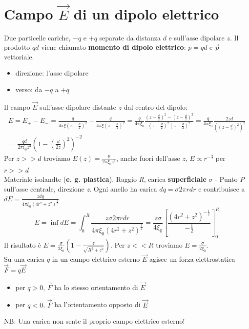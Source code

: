 \section{Campo $\vec{E}$ di un dipolo elettrico}
Due particelle cariche, $-q$ e $+q$ separate da distanza $d$ e sull'asse dipolare $z$. Il prodotto $qd$ viene chiamato \textbf{momento di dipolo elettrico}: $p=qd$ e $\vec{p}$ vettoriale.
\begin{itemize}
\item direzione: l'asse dipolare
\item verso: da $-q$ a $+q$
\end{itemize}
Il campo $\vec{E}$ sull'asse dipolare distante $z$ dal centro del dipolo:
\begin{equation}
  \begin{matrix}
    E=E_+-E_-=\frac{q}{4\pi \xi\left(z-\frac{d}{2}\right)^2}-\frac{q}{4\pi \xi\left(z-\frac{d}{2}\right)^2}
    =\frac{q}{4\pi\xi_0}\frac{\left(z-\frac{d}{2}\right)^2-\left(z-\frac{d}{2}\right)^2}{\left(z-\frac{d}{2}\right)^2\left(z-\frac{d}{2}\right)^2}
    =\frac{q}{4\pi\xi_0}\frac{2zd}{\left(\left(z-\frac{d}{2}\right)^2\right)^{2}}\\
    =\frac{qd}{2\pi\xi_0z^3}\left(1-\left(\frac{d}{2z}\right)^2\right)^{-2}
    \end{matrix}
\end{equation}
Per $z>>d$ troviamo $E(z)=\frac{p}{2\pi\xi_0z^3}$, anche fuori dell'asse $z$, $E\propto r^{-3}$ per $r>>d$\\
Materiale isolandte (\textbf{e. g. plastica}). Raggio \textit{R}, carica \textbf{superficiale} $\sigma$ - Punto \textit{P} sull'asse centrale, direzione \textit{z}. Ogni anello ha carica $dq=\sigma 2\pi rdr$ e contribuisce a $dE=\frac{zdq}{4\pi\xi_0\left(4r^2+z^2\right)^{\frac{3}{2}}}$
\begin{equation}
  E=\inf dE=\int^R_0\frac{z\sigma2\pi rdr}{4\pi\xi_0\left(4r^2+z^2\right)^{\frac{3}{2}}}=\frac{z\sigma}{4\xi_0}\left[\frac{\left(4r^2+z^2\right)^{-\frac{1}{2}}}{-\frac{1}{2}}\right]^R_0
\end{equation}
Il risultato è $E=\frac{\sigma}{2\xi_0}\left(1-\frac{z}{\sqrt{R^2+z^2}}\right)$. Per $z<<R$ troviamo $E=\frac{\sigma}{2\xi_0}$.\\
Su una carica $q$ in un campo elettrico esterno $\vec{E}$ agisce un forza elettrostatica $\vec{F}=q\vec{E}$
\begin{itemize}
  \item per $q>0$, $\vec F$ ha lo stesso orientamento di $\vec E$
  \item per $q<0$, $\vec F$ ha l'orientamento opposto di $\vec E$
\end{itemize}
NB: Una carica non sente il proprio campo elettrico esterno!
